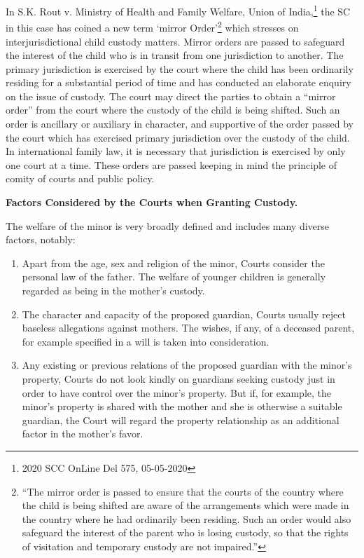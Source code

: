 \begin{multicols}{2}
\noi
In S.K. Rout v. Ministry of Health and Family Welfare, Union of India,\footnote{2020 SCC OnLine Del 575, 05-05-2020} the SC in this case has coined a new term ‘mirror Order’\footnote{“The mirror order is passed to ensure that the courts of the country where the child is being shifted are aware of the arrangements which were made in the country where he had ordinarily been residing. Such an order would also safeguard the interest of the parent who is losing custody, so that the rights of visitation and temporary custody are not impaired.”} which stresses on interjurisdictional child custody matters.
\noi
Mirror orders are passed to safeguard the interest of the child who is in transit from one
jurisdiction to another. The primary jurisdiction is exercised by the court where the child has been
ordinarily residing for a substantial period of time and has conducted an elaborate enquiry on the
issue of custody. The court may direct the parties to obtain a “mirror order” from the court where
the custody of the child is being shifted. Such an order is ancillary or auxiliary in character, and
supportive of the order passed by the court which has exercised primary jurisdiction over the
custody of the child. In international family law, it is necessary that jurisdiction is exercised by
only one court at a time. These orders are passed keeping in mind the principle of comity of courts
and public policy.

\noi
{\normalsize\bfseries {Factors Considered by the Courts when Granting Custody.}}

\noi
The welfare of the minor is very broadly defined and includes many diverse factors, notably:

\vspace{-.3cm}

\begin{enumerate}
\itemsep=0pt
\item Apart from the age, sex and religion of the minor, Courts consider the personal law of the father. The welfare of younger children is generally regarded as being in the mother's custody.

\item The character and capacity of the proposed guardian, Courts usually reject baseless
allegations against mothers. The wishes, if any, of a deceased parent, for example
specified in a will is taken into consideration.


\item Any existing or previous relations of the proposed guardian with the minor's property,
Courts do not look kindly on guardians seeking custody just in order to have control over
the minor's property. But if, for example, the minor's property is shared with the mother
and she is otherwise a suitable guardian, the Court will regard the property relationship as
an additional factor in the mother's favor.


\end{enumerate}
\end{multicols}

